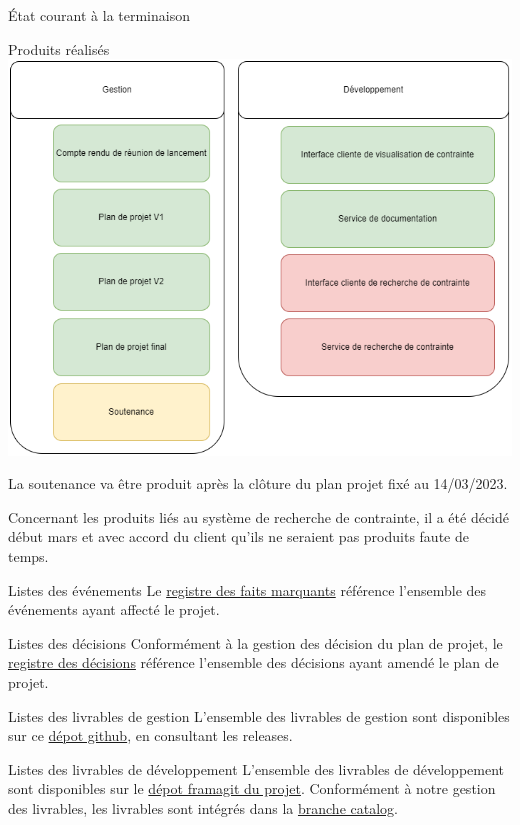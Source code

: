 \documentclass[]{article}
\begin{document}
{\begin{section}{État courant à la terminaison}
\begin{subsection}{Produits réalisés}
     \includegraphics[scale=0.49]{IMG/PBS_final}

     La soutenance va être produit après la clôture du plan projet fixé au 14/03/2023.

     Concernant les produits liés au système de recherche de contrainte, il a été décidé début mars et avec accord du client qu’ils ne seraient pas produits faute de temps.
 \end{subsection}

 \begin{subsection}{Listes des événements}
     Le \href{Registre_des_faits_marquants.pdf}{registre des faits marquants} référence l'ensemble des événements ayant affecté le projet.
 \end{subsection}

 \begin{subsection}{Listes des décisions}
     Conformément à la gestion des décision du plan de projet, le \href{Registre_des_décisions.pdf}{registre des décisions} référence l'ensemble des décisions ayant amendé le plan de projet.
 \end{subsection}

 \begin{subsection}{Listes des livrables de gestion}
     L'ensemble des livrables de gestion sont disponibles sur ce \href{https://github.com/Szyckaa/UE-PROJET-DOCS-GESTION}{dépot github}, en consultant les releases.
 \end{subsection}

 \newpage

 \begin{subsection}{Listes des livrables de développement}
     L'ensemble des livrables de développement sont disponibles sur le \href{https://framagit.org/flopedt/FlOpEDT}{dépot framagit du projet}. Conformément à notre gestion des livrables, les livrables sont intégrés dans la \href{https://framagit.org/flopedt/FlOpEDT/-/tree/catalog}{branche catalog}.
 \end{subsection}
\end{section}

}
\end{document}
